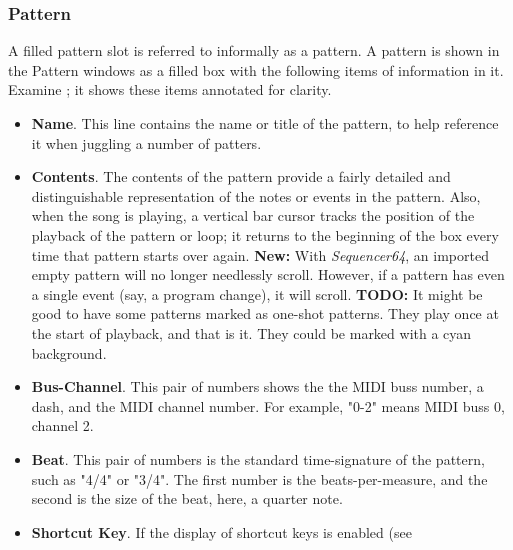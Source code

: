 \subsubsection{Pattern}
\label{subsubsec:seq64_patterns_pattern_filled}

   A filled pattern slot is referred to informally as a pattern.
   A pattern is shown in the Pattern windows as a filled box with the
   following items of information in it.
   Examine ; it shows
   these items annotated for clarity.

   \begin{itemize}
      \item \textbf{Name}.
         This line contains the name or title of the pattern, to help
         reference it when juggling a number of patters.
      \item \textbf{Contents}.
         The contents of the pattern provide a fairly detailed and
         distinguishable representation of the notes or events in the
         pattern.  Also, when the song is playing, a vertical bar cursor
         tracks the position of the playback of the pattern or loop; it
         returns to the beginning of the box every time that pattern starts
         over again.
         \textbf{New:}
         With \textsl{Sequencer64}, an imported empty pattern will no longer
         needlessly scroll.
         However, if a pattern has even a single event (say, a program change),
         it will scroll.
         \textbf{TODO:}
         It might be good to have some patterns marked as one-shot patterns.
         They play once at the start of playback, and that is it.
         They could be marked with a cyan background.
      \item \textbf{Bus-Channel}.
         This pair of numbers shows the the MIDI buss number, a dash, and
         the MIDI channel number.
         For example, "0-2" means MIDI buss 0, channel 2.
      \item \textbf{Beat}.
         This pair of numbers is the standard time-signature of the pattern,
         such as "4/4" or "3/4".  The first number is the beats-per-measure,
         and the second is the size of the beat, here, a quarter note.
      \item \textbf{Shortcut Key}.
         If the display of shortcut keys is enabled (see

\end{itemize}
